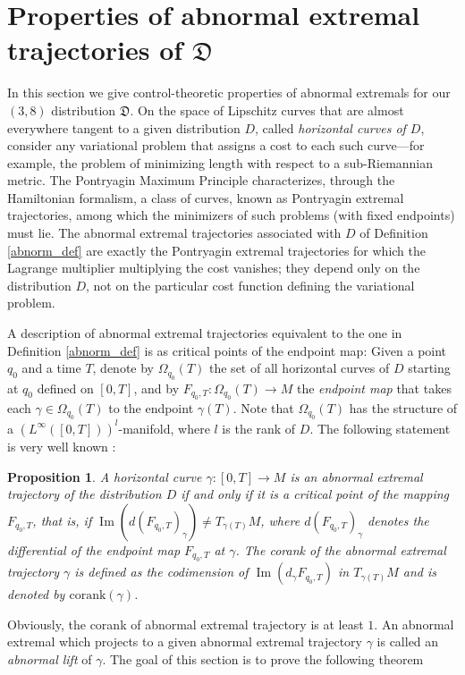 \documentclass[11pt,letterpaper]{amsart}
\newtheorem{prop}[theorem]{Proposition}
\numberwithin{equation}{section}
\begin{document}
\section{Properties of abnormal extremal trajectories of $\mathfrak D$}
\label{section_corank}
In this section we give control-theoretic properties of abnormal extremals for our $(3,8)$ distribution $\mathfrak D$. On the space of Lipschitz curves that are almost everywhere tangent to a given distribution $D$, called \emph{horizontal curves of $D$}, consider any variational problem that assigns a cost to each such curve—for example, the problem of minimizing length with respect to a sub-Riemannian metric. The Pontryagin Maximum Principle \cite{Pontryagin, Agrachev_Sachkov_2004} characterizes, through the Hamiltonian formalism, a class of curves, known as Pontryagin extremal trajectories, among which the minimizers of such problems (with fixed endpoints) must lie. The abnormal extremal trajectories associated with $D$ of Definition \ref{abnorm_def} are exactly the Pontryagin extremal trajectories for which the Lagrange multiplier multiplying the cost vanishes; they depend only on the distribution $D$, not on the particular cost function defining the variational problem.


A description of abnormal extremal trajectories equivalent to the one in Definition \ref{abnorm_def} is as critical points of the endpoint map: Given a point $q_0$ and a time $T$, denote by $\Omega_{q_0}(T)$ the set of all horizontal curves of $D$ starting at $q_0$ defined on $[0,T]$, and by $F_{q_0, T} : \Omega_{q_0}(T) \to M$ the \emph{endpoint map} that takes each $\gamma \in \Omega_{q_0}(T)$ to the endpoint $\gamma(T)$. Note that $\Omega_{q_0}(T)$ has the structure of a $(L^\infty([0,T]))^l$-manifold, where $l$ is the rank of $D$. The following statement is very well known \cite{Agrachev-Sarychev}:
\begin{prop}
\label{abn_def}
A horizontal curve $\gamma : [0, T] \to M$ is an \emph{abnormal extremal trajectory} of the distribution $D$ if and only if it is a critical point of the mapping $F_{q_0,T}$, that is, if $\operatorname{Im} \left( d(F_{q_0,T})_\gamma \right) \neq T_{\gamma(T)} M$, where $d (F_{q_0,T})_\gamma$ denotes the differential of the endpoint map $F_{q_0,T}$ at $\gamma$. The \emph{corank} of the abnormal extremal trajectory $\gamma$ is defined as the codimension of $\operatorname{Im} \left( d_\gamma F_{q_0,T} \right)$ in $T_{\gamma(T)}M$ and is denoted by $\mathrm{corank}(\gamma)$. 
\end{prop}
Obviously, the corank of abnormal extremal trajectory is at least $1$. An abnormal extremal which projects to a given abnormal extremal trajectory $\gamma$ is called an \emph{abnormal lift} of $\gamma$. The goal of this section is to prove the following theorem
\end{document}
